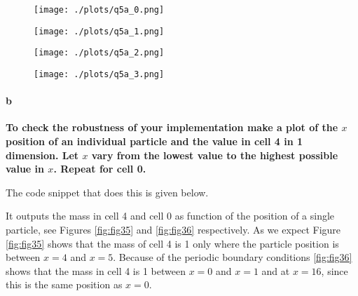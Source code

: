 \begin{figure}[ht]\centering
\begin{minipage}[t]{.5\textwidth}
\centering
\texttt{[image: ./plots/q5a\_0.png]}
\captionsetup{width=0.8\linewidth}
\label{fig:fig31}
\end{minipage}%
\begin{minipage}[t]{.5\textwidth}
\centering
\texttt{[image: ./plots/q5a\_1.png]}
\captionsetup{width=0.8\linewidth}
\label{fig:fig32}
\end{minipage}%
\end{figure}

\begin{figure}[ht]\centering
\begin{minipage}[t]{.5\textwidth}
\centering
\texttt{[image: ./plots/q5a\_2.png]}
\captionsetup{width=0.8\linewidth}
\label{fig:fig33}
\end{minipage}%
\begin{minipage}[t]{.5\textwidth}
\centering
\texttt{[image: ./plots/q5a\_3.png]}
\captionsetup{width=0.8\linewidth}
\label{fig:fig34}
\end{minipage}%
\end{figure}



\paragraph{b} \textbf{To check the robustness of your implementation make a plot of the $x$ position of an individual particle and the value in cell 4 in 1 dimension. Let $x$ vary from the lowest value to the highest possible value in $x$. Repeat for cell 0.}

The code snippet that does this is given below.



It outputs the mass in cell 4 and cell 0 as function of the position of a single particle, see Figures \ref{fig:fig35} and \ref{fig:fig36} respectively. As we expect Figure \ref{fig:fig35} shows that the mass of cell 4 is 1 only where the particle position is between $x=4$ and $x=5$. Because of the periodic boundary conditions \ref{fig:fig36} shows that the mass in cell 4 is 1 between $x=0$ and $x=1$ and at $x=16$, since this is the same position as $x=0$. 

